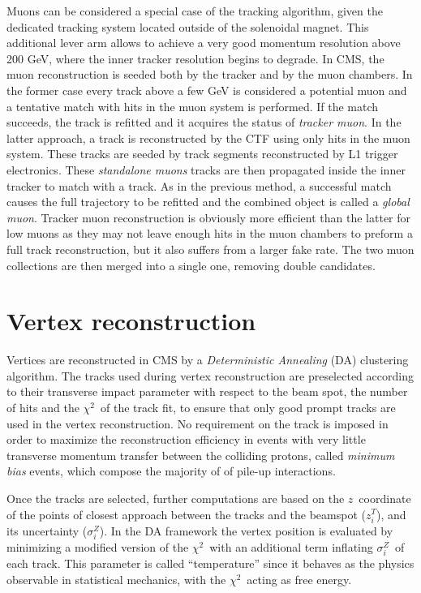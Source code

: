 Muons can be considered a special case of the tracking algorithm, given the dedicated tracking system located outside of the solenoidal magnet. This additional lever arm allows to achieve a very good momentum resolution above 200 GeV, where the inner tracker resolution begins to degrade. 
In CMS, the muon reconstruction is seeded both by the tracker and by the muon chambers. In the former case every track above a few GeV is considered a potential muon and a tentative match with hits in the muon system is performed. If the match succeeds, the track is refitted and it acquires the status of \emph{tracker muon}. In the latter approach, a track is reconstructed by the CTF using only hits in the muon system. These tracks are seeded by track segments reconstructed by L1 trigger electronics. These \emph{standalone muons} tracks are then propagated inside the inner tracker to match with a track. As in the previous method, a successful match causes the full trajectory to be refitted and the combined object is called a \emph{global muon}. Tracker muon reconstruction is obviously more efficient than the latter for low \pT muons as they may not leave enough hits in the muon chambers to preform a full track reconstruction, but it also suffers from a larger fake rate. The two muon collections are then merged into a single one, removing double candidates.

\section{Vertex reconstruction}

Vertices are reconstructed in CMS by a \emph{Deterministic Annealing} (DA) \cite{IEEE_DetAnnealing} clustering algorithm. The tracks used during vertex reconstruction are preselected according to their transverse impact parameter with respect to the beam spot, the number of hits and the $\chi^2$\ of the track fit, to ensure that only good prompt tracks are used in the vertex reconstruction. No requirement on the track \pT is imposed in order to maximize the reconstruction efficiency in events with very little transverse momentum transfer between the colliding protons, called \emph{minimum bias} events, which compose the majority of of pile-up interactions.

Once the tracks are selected, further computations are based on the $z$\ coordinate of the points of closest approach between the tracks and the beamspot ($z_i^T$), and its uncertainty ($\sigma_i^Z$). In the DA framework the vertex position is evaluated by minimizing a modified version of the $\chi^2$\ with an additional term inflating $\sigma_i^Z$\ of each track. This parameter is called ``temperature'' since it behaves as the physics observable in statistical mechanics, with the  $\chi^2$\ acting as free energy.

